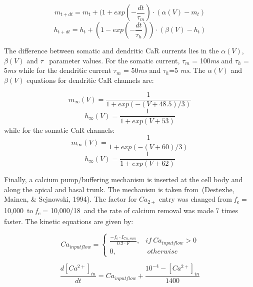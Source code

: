 \documentclass[12pt]{article}
\begin{document}
\begin{equation}
m_{t+dt}=m_t+(1+exp(-\frac{dt}{\tau_m})\cdot (\alpha(V)-m_t)
\end{equation}
\begin{equation}
h_{t+dt}=h_t+(1-exp(-\frac{dt}{\tau_h}))\cdot (\beta(V) - h_t)
\end{equation}

The difference between somatic and dendritic CaR currents lies in the $\alpha(V)$, $\beta(V)$ and $\tau$ ~parameter
values. For the somatic current, $\tau_m$ = 100\textit{ms} and
$\tau_h$ = 5\textit{ms} while for the dendritic current $\tau_m$ = 50\textit{ms} and $\tau_h$=5 \textit{ ms}. The $\alpha(V)$ and $\beta(V)$ equations for dendritic CaR channels are:


\begin{equation}
m_{\infty}(V)=\frac {1}{1+exp(-(V+48.5)/3)}
\end{equation}
\begin{equation}
h_{\infty}(V)=\frac {1}{1+exp(V+53)}
\end{equation}
while for the somatic CaR channels:
\begin{equation}
m_{\infty}(V)=\frac {1}{1+exp(-(V+60)/3)}
\end{equation}
\begin{equation}
h_{\infty}(V)=\frac {1}{1+exp(V+62)}
\end{equation}

Finally, a calcium pump/buffering mechanism is inserted at the cell body and along the apical and basal trunk. The
mechanism is taken from~(Destexhe, Mainen, \& Sejnowski, 1994). The factor for
$Ca_{2+}$ entry was changed from
\textit{f\textsubscript{e}} = 10,000~to \textit{f\textsubscript{e}} = 10,000/18~and the rate of calcium removal was made 7 times faster. The kinetic equations are given by:

\begin{equation}
Ca_{input flow} = \begin{cases} \frac{-f_e \cdot I_{Ca, sum} }{0.2 \cdot F}, & if \ Ca_{input flow} > 0  \\ 0, & \  otherwise \ \end{cases}
\end{equation}

\begin{equation}
\frac{d[Ca^{2+}]_{in}}{dt}=Ca_{input flow} +\frac{10^{-4}-[Ca^{2+}]_{in}}{1400}
\end{equation}
\end{document}
